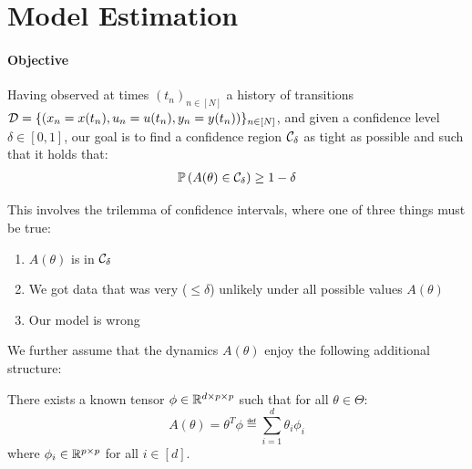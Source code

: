\documentclass{article}
\begin{document}
\section{Model Estimation}

\paragraph{Objective}%
Having observed at times $(t_n)_{n\in[N]}$ a history of transitions $\mathcal{D} = \{(x_n = x(t_n), u_n = u(t_n), y_n = y(t_n))\}_{n\in[N]}$, and given a confidence level $\delta\in[0, 1]$, our goal is to find a confidence region $\mathcal{C}_\delta$ as tight as possible and such that it holds that:
\begin{align}
\mathbb{P}\left(A(\theta)\in \mathcal{C}_\delta\right) \geq 1-\delta
\label{eq:polytope}
\end{align}

This involves the trilemma of confidence intervals, where one of three things must be true:
\begin{enumerate}
    \item $A(\theta)$ is in $\mathcal{C}_\delta$
    \item We got data that was very ($\leq\delta$) unlikely under all possible values $A(\theta)$
    \item Our model is wrong
\end{enumerate}


We further assume that the dynamics $A(\theta)$ enjoy the following additional structure:
\begin{assumption}
\label{assumpt:linear_param}
There exists a known tensor $\phi\in \mathbb{R}^{d \times p \times p}$ such that for all $\theta\in\Theta$:
\begin{equation}
    A(\theta) = \theta^T \phi \eqdef \sum_{i=1}^d \theta_i\phi_i
\end{equation}
where $\phi_i\in\mathbb{R}^{p\times p}$ for all $i\in[d]$.
\end{assumption}
\end{document}

